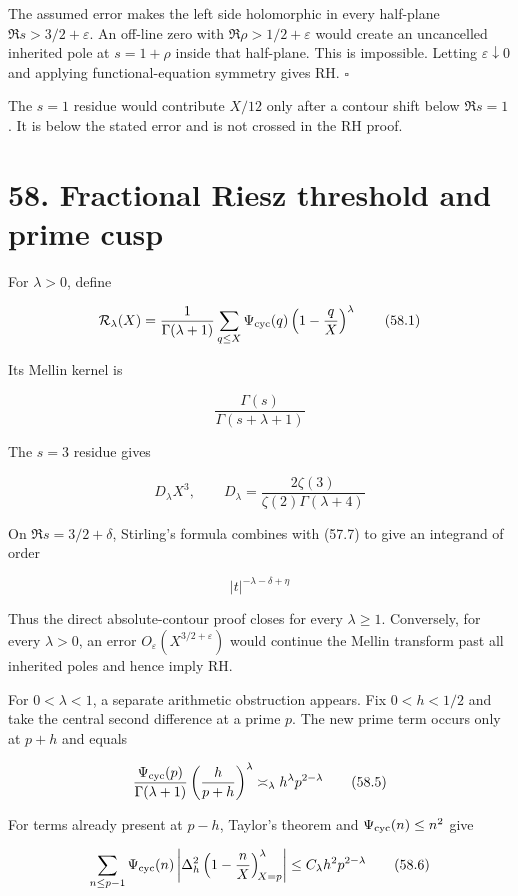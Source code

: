 \documentclass[
  11pt,
]{book}
\begin{document}
The assumed error makes the left side holomorphic in every half-plane
\(\Re s>3/2+\varepsilon\). An off-line zero with
\(\Re\rho>1/2+\varepsilon\) would create an uncancelled inherited pole
at \(s=1+\rho\) inside that half-plane. This is impossible. Letting
\(\varepsilon\downarrow0\) and applying functional-equation symmetry
gives RH. \(\square\)

The \(s=1\) residue would contribute \(X/12\) only after a contour shift
below \(\Re s=1\). It is below the stated error and is not crossed in
the RH proof.

\section{58. Fractional Riesz threshold and prime
cusp}\label{fractional-riesz-threshold-and-prime-cusp}

For \(\lambda>0\), define

\[
\mathcal R_\lambda(X)
=\frac1{\Gamma(\lambda+1)}
\sum_{q\le X}\Psi_{\rm cyc}(q)
\left(1-\frac qX\right)^\lambda
\tag{58.1}
\]

Its Mellin kernel is

\[
\boxed{
\frac{\Gamma(s)}{\Gamma(s+\lambda+1)}}
\tag{58.2}
\]

The \(s=3\) residue gives

\[
D_\lambda X^3,\qquad
D_\lambda=
\frac{2\zeta(3)}
{\zeta(2)\Gamma(\lambda+4)}
\tag{58.3}
\]

On \(\Re s=3/2+\delta\), Stirling's formula combines with (57.7) to give
an integrand of order

\[
|t|^{-\lambda-\delta+\eta}
\tag{58.4}
\]

Thus the direct absolute-contour proof closes for every \(\lambda\ge1\).
Conversely, for every \(\lambda>0\), an error
\(O_\varepsilon(X^{3/2+\varepsilon})\) would continue the Mellin
transform past all inherited poles and hence imply RH.

For \(0<\lambda<1\), a separate arithmetic obstruction appears. Fix
\(0<h<1/2\) and take the central second difference at a prime \(p\). The
new prime term occurs only at \(p+h\) and equals

\[
\frac{\Psi_{\rm cyc}(p)}{\Gamma(\lambda+1)}
\left(\frac{h}{p+h}\right)^\lambda
\asymp_\lambda h^\lambda p^{2-\lambda}
\tag{58.5}
\]

For terms already present at \(p-h\), Taylor's theorem and
\(\Psi_{\rm cyc}(n)\le n^2\) give

\[
\sum_{n\le p-1}\Psi_{\rm cyc}(n)
\left|\Delta_h^2
\left(1-\frac nX\right)^\lambda_{\!X=p}\right|
\le C_\lambda h^2p^{2-\lambda}
\tag{58.6}
\]
\end{document}
